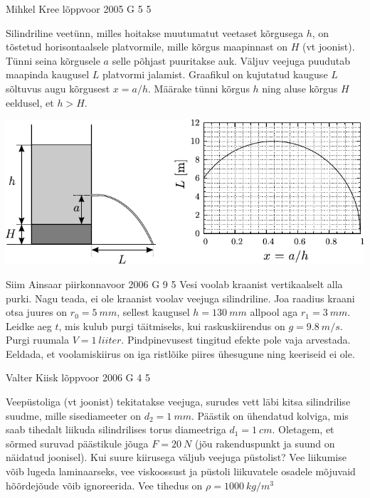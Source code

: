 \documentclass[11pt]{article}
\begin{document}
{%
{Mihkel Kree} %
{lõppvoor} %
{2005} %
{G 5} %
{5} %
{
\ifStatement
Silindriline veetünn, milles hoitakse muutumatut veetaset kõrgusega $h$, on tõstetud horisontaalsele platvormile, mille kõrgus maapinnast on $H$ (vt joonist). Tünni seina kõrgusele $a$ selle põhjast puuritakse auk. Väljuv veejuga puudutab maapinda kaugusel $L$ platvormi jalamist. Graafikul on kujutatud kauguse $L$ sõltuvus augu kõrgusest $x = a/h$. Määrake tünni kõrgus $h$ ning aluse kõrgus $H$ eeldusel, et $h > H$.

\begin{center}
	\includegraphics[width=\linewidth]{2005-v3g-05-yl}
\end{center}
\fi
}

{Siim Ainsaar} %
{piirkonnavoor} %
{2006} %
{G 9} %
{5} %
{
\ifStatement
Vesi voolab kraanist vertikaalselt alla purki. Nagu teada, ei ole kraanist voolav veejuga silindriline. Joa raadius kraani otsa juures on $r_0 = \SI{5}{mm}$, sellest kaugusel $h = \SI{130}{mm}$ allpool aga $r_1 = \SI{3}{mm}$. Leidke aeg $t$, mis kulub purgi täitmiseks, kui raskuskiirendus on $g = \SI{9,8}{m/s}$. Purgi ruumala $V = \SI{1}{liiter}$. Pindpinevusest tingitud efekte pole vaja arvestada. Eeldada, et voolamiskiirus on iga ristlõike piires ühesugune ning keeriseid ei ole. 
\fi
}

{Valter Kiisk} %
{lõppvoor} %
{2006} %
{G 4} %
{5} %
{
\ifStatement
Veepüstoliga (vt joonist) tekitatakse veejuga, surudes vett läbi kitsa silindrilise suudme, mille sisediameeter on $d_2 = \SI{1}{mm}$. Päästik on ühendatud kolviga, mis saab tihedalt liikuda silindrilises torus diameetriga $d_1 = \SI{1}{cm}$. Oletagem, et sõrmed suruvad päästikule jõuga $F = \SI{20}{N}$ (jõu rakenduspunkt ja suund on näidatud joonisel). Kui suure kiirusega väljub veejuga püstolist? Vee liikumise võib lugeda laminaarseks, vee viskoossust ja püstoli liikuvatele osadele mõjuvaid hõõrdejõude võib ignoreerida. Vee tihedus on $\rho = \SI{1000}{kg/m^3}$

}}
\end{document}
